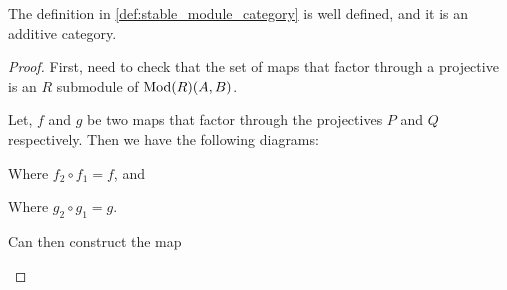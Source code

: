 \begin{theorem}
    The definition in \autoref{def:stable_module_category} is well defined, and it is an additive category.
\end{theorem}
\begin{proof}
    First, need to check that the set of maps that factor through a projective is an \( R \) submodule of \( \operatorname{Mod}(R)(A, B) \).

    Let, \( f \) and \( g \) be two maps that factor through the projectives \( P \) and \( Q \) respectively. Then we have the following diagrams:

    \begin{center}
    \end{center}

    Where \( f_2 \circ f_1 = f \), and

    \begin{center}
    \end{center}

    Where \( g_2 \circ g_1 = g \).

    Can then construct the map

    \begin{center}
    \end{center}


\end{proof}
